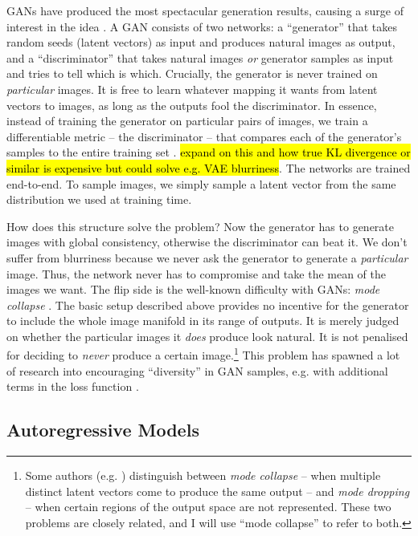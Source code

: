 \documentclass[10pt,a4paper]{article}
\newcommand{\nquote}[1]{``{#1}''}
\begin{document}
GANs have produced the most spectacular generation results, causing a surge of interest in the idea \cite{??,??,??}. A GAN consists of two networks: a \nquote{generator} that takes random seeds (latent vectors) as input and produces natural images as output, and a \nquote{discriminator} that takes natural images \emph{or} generator samples as input and tries to tell which is which. Crucially, the generator is never trained on \emph{particular} images. It is free to learn whatever mapping it wants from latent vectors to images, as long as the outputs fool the discriminator. In essence, instead of training the generator on particular pairs of images, we train a differentiable metric -- the discriminator -- that compares each of the generator's samples to the entire training set \cite{??}. \hl{expand on this and how true KL divergence or similar is expensive but could solve e.g. VAE blurriness}. The networks are trained end-to-end. To sample images, we simply sample a latent vector from the same distribution we used at training time.

How does this structure solve the problem? Now the generator has to generate images with global consistency, otherwise the discriminator can beat it. We don't suffer from blurriness because we never ask the generator to generate a \emph{particular} image. Thus, the network never has to compromise and take the mean of the images we want. The flip side is the well-known difficulty with GANs: \emph{mode collapse} \cite{gantechniques}. The basic setup described above provides no incentive for the generator to include the whole image manifold in its range of outputs. It is merely judged on whether the particular images it \emph{does} produce look natural. It is not penalised for deciding to \emph{never} produce a certain image.\footnote{Some authors (e.g. \cite{ganmetrics}) distinguish between \emph{mode collapse} -- when multiple distinct latent vectors come to produce the same output -- and \emph{mode dropping} -- when certain regions of the output space are not represented. These two problems are closely related, and I will use \nquote{mode collapse} to refer to both.} This problem has spawned a lot of research into encouraging \nquote{diversity} in GAN samples, e.g. with additional terms in the loss function \cite{??,??,??}.

\subsection{Autoregressive Models}
\end{document}
